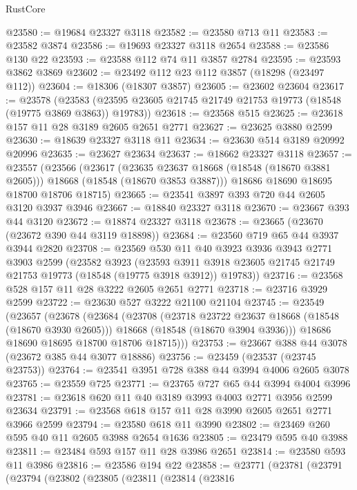 \begin{lexlean}{RustCore}
\begin{coremodule}
@23580 := @19684 @23327 @3118
@23582 := @23580 @713 @11
@23583 := @23582 @3874
@23586 := @19693 @23327 @3118 @2654
@23588 := @23586 @130 @22
@23593 := @23588 @112 @74 @11 @3857 @2784
@23595 := @23593 @3862 @3869
@23602 := @23492 @112 @23 @112 @3857 (@18298 (@23497 @112))
@23604 := @18306 (@18307 @3857)
@23605 := @23602 @23604
@23617 := @23578
    (@23583 (@23595 @23605 @21745 @21749 @21753 @19773 (@18548 (@19775 @3869 @3863)) @19783))
@23618 := @23568 @515
@23625 := @23618 @157 @11 @28 @3189 @2605 @2651 @2771
@23627 := @23625 @3880 @2599
@23630 := @18639 @23327 @3118 @11
@23634 := @23630 @514 @3189 @20992 @20996
@23635 := @23627 @23634
@23637 := @18662 @23327 @3118
@23657 := @23557
    (@23566
      (@23617
        (@23635 @23637 @18668 (@18548 (@18670 @3881 @2605)))
        @18668
        (@18548 (@18670 @3853 @3887)))
      @18686
      @18690
      @18695
      @18700
      @18706
      @18715)
@23665 := @23541 @3897 @393 @720 @44 @2605 @3120 @3937 @3946
@23667 := @18840 @23327 @3118
@23670 := @23667 @393 @44 @3120
@23672 := @18874 @23327 @3118
@23678 := @23665 (@23670 (@23672 @390 @44 @3119 @18898))
@23684 := @23560 @719 @65 @44 @3937 @3944 @2820
@23708 := @23569
    @530
    @11
    @40
    @3923
    @3936
    @3943
    @2771
    @3903
    @2599
    (@23582
      @3923
      (@23593 @3911 @3918 @23605 @21745 @21749 @21753 @19773 (@18548 (@19775 @3918 @3912)) @19783))
@23716 := @23568 @528 @157 @11 @28 @3222 @2605 @2651 @2771
@23718 := @23716 @3929 @2599
@23722 := @23630 @527 @3222 @21100 @21104
@23745 := @23549
    (@23657
      (@23678
        (@23684
          (@23708
            (@23718 @23722 @23637 @18668 (@18548 (@18670 @3930 @2605)))
            @18668
            (@18548 (@18670 @3904 @3936)))
          @18686
          @18690
          @18695
          @18700
          @18706
          @18715)))
@23753 := @23667 @388 @44 @3078 (@23672 @385 @44 @3077 @18886)
@23756 := @23459 (@23537 (@23745 @23753))
@23764 := @23541 @3951 @728 @388 @44 @3994 @4006 @2605 @3078
@23765 := @23559 @725
@23771 := @23765 @727 @65 @44 @3994 @4004 @3996
@23781 := @23618 @620 @11 @40 @3189 @3993 @4003 @2771 @3956 @2599 @23634
@23791 := @23568 @618 @157 @11 @28 @3990 @2605 @2651 @2771 @3966 @2599
@23794 := @23580 @618 @11 @3990
@23802 := @23469 @260 @595 @40 @11 @2605 @3988 @2654 @1636
@23805 := @23479 @595 @40 @3988
@23811 := @23484 @593 @157 @11 @28 @3986 @2651
@23814 := @23580 @593 @11 @3986
@23816 := @23586 @194 @22
@23858 := @23771
    (@23781
      (@23791
        (@23794
          (@23802
            (@23805
              (@23811
                (@23814
                  (@23816

\end{coremodule}
\end{lexlean}
